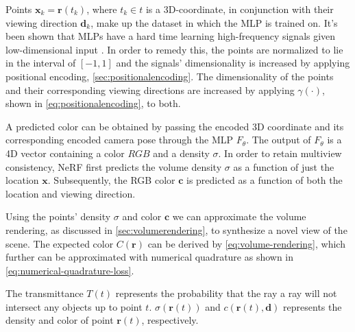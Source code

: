 


Points $\pmb{x}_k = \pmb{r}(t_k)$, where $t_k \in t$ is a 3D-coordinate, in conjunction with their viewing direction $\pmb{d}_k$, make up the dataset in which the MLP is trained on. It's been shown that MLPs have a hard time learning high-frequency signals given low-dimensional input \cite{tancik_fourier_2020}. In order to remedy this, the points are normalized to lie in the interval of $[-1, 1]$ and the signals' dimensionality is increased by applying positional encoding, \autoref{sec:positionalencoding}. The dimensionality of the points and their corresponding viewing directions are increased by applying $\gamma(\cdot)$, shown in \autoref{eq:positionalencoding}, to both.



A predicted color can be obtained by passing the encoded 3D coordinate and its corresponding encoded camera pose through the MLP $F_{\theta}$. The output of $F_\theta$ is a 4D vector containing a color $RGB$ and a density $\sigma$. In order to retain multiview consistency, NeRF first predicts the volume density $\sigma$ as a function of just the location $\textbf{x}$. Subsequently, the RGB color $\pmb{c}$ is predicted as a function of both the location and viewing direction.


Using the points' density $\sigma$ and color $\pmb{c}$ we can approximate the volume rendering, as discussed in \autoref{sec:volumerendering}, to synthesize a novel view of the scene. The expected color $C(\pmb{r})$ can be derived by \autoref{eq:volume-rendering}, which further can be approximated with numerical quadrature as shown in \autoref{eq:numerical-quadrature-loss}.





The transmittance $T(t)$ represents the probability that the ray a ray will not intersect any objects up to point $t$. $\sigma(\pmb{r}(t))$ and $c(\pmb{r}(t), \pmb{d})$ represents the density and color of point $\pmb{r}(t)$, respectively.


